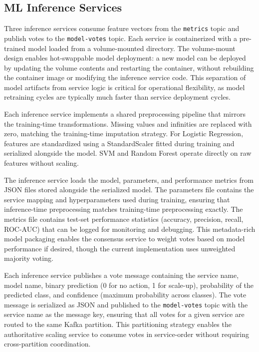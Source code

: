 \documentclass[conference]{IEEEtran}
\begin{document}
\subsection{ML Inference Services}

Three inference services consume feature vectors from the \texttt{metrics} topic and publish votes to the \texttt{model-votes} topic. Each service is containerized with a pre-trained model loaded from a volume-mounted directory. The volume-mount design enables hot-swappable model deployment: a new model can be deployed by updating the volume contents and restarting the container, without rebuilding the container image or modifying the inference service code. This separation of model artifacts from service logic is critical for operational flexibility, as model retraining cycles are typically much faster than service deployment cycles.

Each inference service implements a shared preprocessing pipeline that mirrors the training-time transformations. Missing values and infinities are replaced with zero, matching the training-time imputation strategy. For Logistic Regression, features are standardized using a StandardScaler fitted during training and serialized alongside the model. SVM and Random Forest operate directly on raw features without scaling.

The inference service loads the model, parameters, and performance metrics from JSON files stored alongside the serialized model. The parameters file contains the service mapping and hyperparameters used during training, ensuring that inference-time preprocessing matches training-time preprocessing exactly. The metrics file contains test-set performance statistics (accuracy, precision, recall, ROC-AUC) that can be logged for monitoring and debugging. This metadata-rich model packaging enables the consensus service to weight votes based on model performance if desired, though the current implementation uses unweighted majority voting.


Each inference service publishes a vote message containing the service name, model name, binary prediction (0 for no action, 1 for scale-up), probability of the predicted class, and confidence (maximum probability across classes). The vote message is serialized as JSON and published to the \texttt{model-votes} topic with the service name as the message key, ensuring that all votes for a given service are routed to the same Kafka partition. This partitioning strategy enables the authoritative scaling service to consume votes in service-order without requiring cross-partition coordination.
\end{document}
